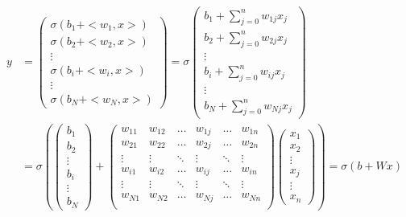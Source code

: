 \documentclass[12pt, twoside]{report}
\begin{document}
\begin{equation} \label{def_couche}
    \begin{split}
        y & =
        \left(\begin{matrix}
            \sigma(b_1 + <w_1, x>) \\
            \sigma(b_2 + <w_2, x>) \\
            \vdots \\
            \sigma(b_i + <w_i, x>) \\
            \vdots \\
            \sigma(b_N + <w_N, x>)
        \end{matrix}\right)
        =
        \sigma\left(\begin{matrix}
            b_1 + \sum_{j=0}^{n} w_{1j}x_j \\
            b_2 + \sum_{j=0}^{n} w_{2j}x_j \\
            \vdots \\
            b_i + \sum_{j=0}^{n} w_{ij}x_j \\
            \vdots \\
            b_N + \sum_{j=0}^{n} w_{Nj}x_j
        \end{matrix}\right)\\
        & = \sigma\left(
            \left(\begin{matrix}
                b_1 \\ b_2 \\ \vdots \\ b_i \\ \vdots \\ b_N
            \end{matrix}\right)
            +
            \left(\begin{matrix}
                w_{11} & w_{12} & \hdots & w_{1j} & \hdots & w_{1n} \\
                w_{21} & w_{22} & \hdots & w_{2j} & \hdots & w_{2n} \\
                \vdots & \vdots & \ddots & \vdots & \ddots & \vdots \\
                w_{i1} & w_{i2} & \hdots & w_{ij} & \hdots & w_{in} \\
                \vdots & \vdots & \ddots & \vdots & \ddots & \vdots \\
                w_{N1} & w_{N2} & \hdots & w_{Nj} & \hdots & w_{Nn} \\
            \end{matrix}\right)
            \left(\begin{matrix}
                x_1 \\ x_2 \\ \vdots \\ x_j \\ \vdots \\ x_n
            \end{matrix}\right)
        \right)
        = \sigma(b + Wx)
    \end{split}
\end{equation}
\end{document}
